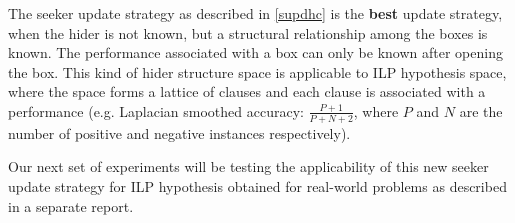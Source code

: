 \documentclass[11pt,a4paper]{article}
\begin{document}
The seeker update strategy as described in \ref{supdhc} is the \textbf{best} update strategy, when the hider is not known, but a structural relationship among the boxes is known. The performance 
associated with a box can only be known after opening the box. This kind of hider structure space is applicable to ILP hypothesis space, where the space forms a lattice of clauses and each clause is associated with a performance (e.g. Laplacian smoothed accuracy: $\frac{P+1}{P+N+2}$, where $P$ and $N$ are the number of positive and negative instances respectively).

Our next set of experiments will be testing the applicability of this new seeker update strategy for ILP hypothesis obtained for real-world problems as described in a separate report.

	
\end{document}
